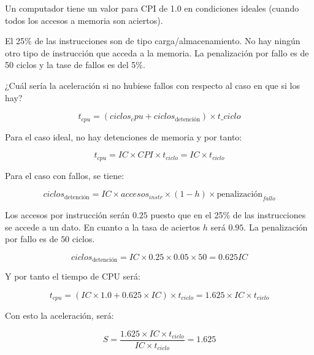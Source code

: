 \begin{acexercise}\end{acexercise}

Un computador tiene un valor para CPI de 1.0 en condiciones ideales
(cuando todos los accesos a memoria son aciertos).

El 25\% de las instrucciones son de tipo carga/almacenamiento.
No hay ningún otro tipo de instrucción que acceda a la memoria.
La penalización por fallo es de 50 ciclos y la tase de fallos 
es del 5\%.

¿Cuál sería la aceleración si no hubiese fallos con respecto al
caso en que si los hay?

\begin{acsolution}\end{acsolution}

\[
t_{cpu} = (ciclos_cpu + ciclos_{\text{detención}}) \times t\_{ciclo}
\]

Para el caso ideal, no hay detenciones de memoria y por tanto:

\[
t_{cpu} = IC \times CPI \times t_{ciclo} =
IC \times t_{ciclo}
\]

Para el caso con fallos, se tiene:

\[
ciclos_{\text{detención}} =
IC \times accesos_{instr} \times (1 - h) \times \text{penalización}_{fallo}
\]

Los accesos por instrucción serán $0.25$ puesto que
en el 25\% de las instrucciones se accede a un dato. En cuanto a la tasa de
aciertos $h$ será $0.95$. La penalización por fallo es de $50$ ciclos.

\[
ciclos_{\text{detención}} =
IC \times 0.25 \times 0.05 \times 50 =
0.625 IC
\]

Y por tanto el tiempo de CPU será:

\[
t_{cpu} = (IC \times 1.0 + 0.625 \times IC) \times t_{ciclo} =
1.625 \times IC \times t_{ciclo}
\]

Con esto la aceleración, será:

\[
S = \frac{1.625 \times IC \times t_{ciclo}}{IC \times t_{ciclo}} = 1.625
\]
